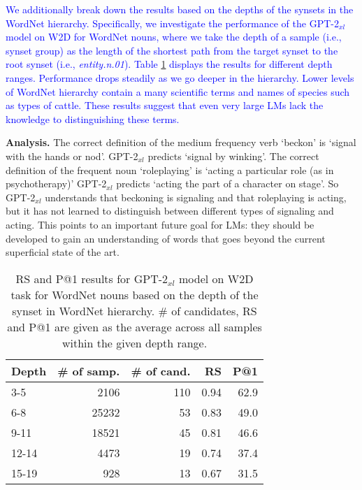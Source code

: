 \documentclass[11pt,a4paper]{article}
\begin{document}
\textcolor{blue}{We additionally break down the results based on the depths of the synsets in the WordNet hierarchy. Specifically, we investigate the performance of the GPT-2$_{xl}$ model on W2D for WordNet nouns, where we take the depth of a sample (i.e., synset group) as the length of the shortest path from the target synset to the root synset (i.e., \textit{entity.n.01}). Table \ref{tab:WN_depth} displays the results for different depth ranges. Performance drops steadily as we go deeper in the hierarchy. Lower levels of WordNet hierarchy contain a many scientific terms and names of species such as types of cattle. These results suggest that even very large LMs lack the knowledge to distinguishing these terms.}

\textbf{Analysis.}
The correct definition of the medium frequency verb `beckon' is  `signal with the hands or nod'. GPT-2$_{xl}$ predicts  `signal by winking'.
The correct definition of the frequent noun `roleplaying' is `acting a particular role (as in psychotherapy)' GPT-2$_{xl}$ predicts `acting the part of a character on stage'.
So GPT-2$_{xl}$ understands that beckoning is signaling and that roleplaying is acting, but it has not learned to distinguish between different types of signaling and acting.
This points to an important future goal for LMs: they should be developed to gain an understanding of words that goes beyond the current superficial state of the art.


\begin{table}
    \centering
    \begin{tabular}{l|rrrr}
        \hline
         \textbf{Depth} & \textbf{\# of samp.} & \textbf{\# of cand.} & \textbf{RS} & \textbf{P@1} \\ \hline
     3-5 & 2106 & 110 & 0.94 & 62.9 \\
     6-8 & 25232 & 53 & 0.83 & 49.0 \\
     9-11 & 18521 & 45 & 0.81 & 46.6 \\
     12-14 & 4473 & 19 & 0.74 & 37.4 \\ 
     15-19 & 928 & 13 & 0.67 & 31.5 \\ \hline
     
    \end{tabular}
    \caption{RS and P@1 results for GPT-2$_{xl}$ model on W2D task for WordNet nouns based on the depth of the synset in WordNet hierarchy. \# of candidates, RS and P@1 are given as the average across all samples within the given depth range. }
    \label{tab:WN_depth}
\end{table}
\end{document}

